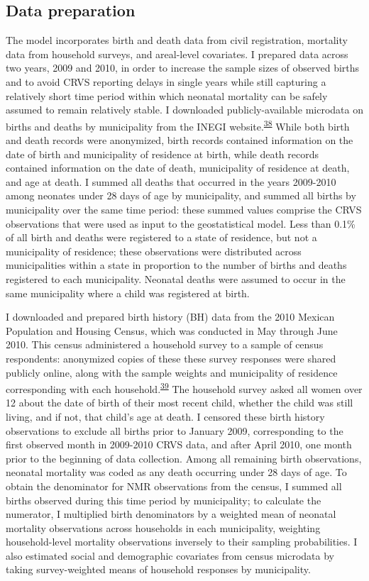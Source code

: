 \documentclass[
]{article}
\begin{document}
\hypertarget{data-preparation}{%
\subsection{Data preparation}\label{data-preparation}}

The model incorporates birth and death data from civil registration, mortality data from household surveys, and areal-level covariates. I prepared data across two years, 2009 and 2010, in order to increase the sample sizes of observed births and to avoid CRVS reporting delays in single years while still capturing a relatively short time period within which neonatal mortality can be safely assumed to remain relatively stable. I downloaded publicly-available microdata on births and deaths by municipality from the INEGI website.\textsuperscript{\protect\hyperlink{ref-INEGI2010}{38}} While both birth and death records were anonymized, birth records contained information on the date of birth and municipality of residence at birth, while death records contained information on the date of death, municipality of residence at death, and age at death. I summed all deaths that occurred in the years 2009-2010 among neonates under 28 days of age by municipality, and summed all births by municipality over the same time period: these summed values comprise the CRVS observations that were used as input to the geostatistical model. Less than 0.1\% of all birth and deaths were registered to a state of residence, but not a municipality of residence; these observations were distributed across municipalities within a state in proportion to the number of births and deaths registered to each municipality. Neonatal deaths were assumed to occur in the same municipality where a child was registered at birth.

I downloaded and prepared birth history (BH) data from the 2010 Mexican Population and Housing Census, which was conducted in May through June 2010. This census administered a household survey to a sample of census respondents: anonymized copies of these these survey responses were shared publicly online, along with the sample weights and municipality of residence corresponding with each household.\textsuperscript{\protect\hyperlink{ref-INEGI2010a}{39}} The household survey asked all women over 12 about the date of birth of their most recent child, whether the child was still living, and if not, that child's age at death. I censored these birth history observations to exclude all births prior to January 2009, corresponding to the first observed month in 2009-2010 CRVS data, and after April 2010, one month prior to the beginning of data collection. Among all remaining birth observations, neonatal mortality was coded as any death occurring under 28 days of age. To obtain the denominator for NMR observations from the census, I summed all births observed during this time period by municipality; to calculate the numerator, I multiplied birth denominators by a weighted mean of neonatal mortality observations across households in each municipality, weighting household-level mortality observations inversely to their sampling probabilities. I also estimated social and demographic covariates from census microdata by taking survey-weighted means of household responses by municipality.
\end{document}
